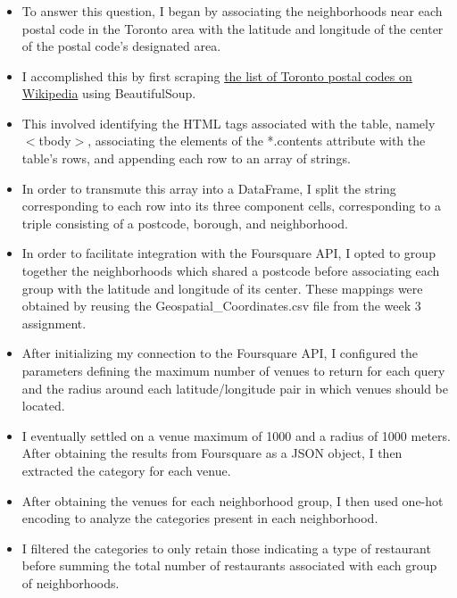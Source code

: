 \documentclass[aspectratio=169]{beamer}
\begin{document}
\subsubsection{}
\begin{frame}

\begin{itemize}
 \item To answer this question, I began by associating the neighborhoods near each postal code in the Toronto area with the latitude and longitude of the center of the postal code's designated area.
 \item I accomplished this by first scraping \href{https://en.wikipedia.org/wiki/List_of_postal_codes_of_Canada:_M}{the list of Toronto postal codes on Wikipedia} using BeautifulSoup.
 \item This involved identifying the HTML tags associated with the table, namely $<$tbody$>$, associating the elements of the *.contents attribute with the table's rows, and appending each row to an array of strings.
 \item In order to transmute this array into a DataFrame, I split the string corresponding to each row into its three component cells, corresponding to a triple consisting of a postcode, borough, and neighborhood.
 \item In order to facilitate integration with the Foursquare API, I opted to group together the neighborhoods which shared a postcode before associating each group with the latitude and longitude of its center. These mappings were obtained by reusing the Geospatial\_Coordinates.csv file from the week 3 assignment.
\end{itemize}

\end{frame}

\begin{frame}
\begin{itemize}
 \item After initializing my connection to the Foursquare API, I configured the parameters defining the maximum number of venues to return for each query and the radius around each latitude/longitude pair in which venues should be located.
 \item I eventually settled on a venue maximum of 1000 and a radius of 1000 meters. After obtaining the results from Foursquare as a JSON object, I then extracted the category for each venue.
 \item After obtaining the venues for each neighborhood group, I then used one-hot encoding to analyze the categories present in each neighborhood.
 \item I filtered the categories to only retain those indicating a type of restaurant before summing the total number of restaurants associated with each group of neighborhoods.

\end{itemize}
 \end{frame}
 
\end{document}
